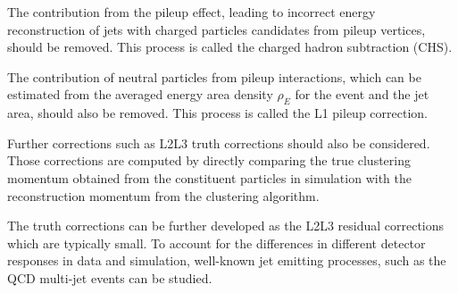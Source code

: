 The contribution from the pileup effect, leading to incorrect energy reconstruction of jets with charged particles candidates from pileup vertices, should be removed.
This process is called the charged hadron subtraction (CHS).

The contribution of neutral particles from pileup interactions, which can be estimated from the averaged energy area density $\rho_E$ for the event and the jet area, should also be removed.
This process is called the L1 pileup correction.

Further corrections such as L2L3 truth corrections should also be considered.
Those corrections are computed by directly comparing the true clustering momentum obtained from the constituent particles in simulation with the reconstruction momentum from the clustering algorithm.

The truth corrections can be further developed as the L2L3 residual corrections which are typically small.
To account for the differences in different detector responses in data and simulation, well-known jet emitting processes, such as the QCD multi-jet events can be studied.

